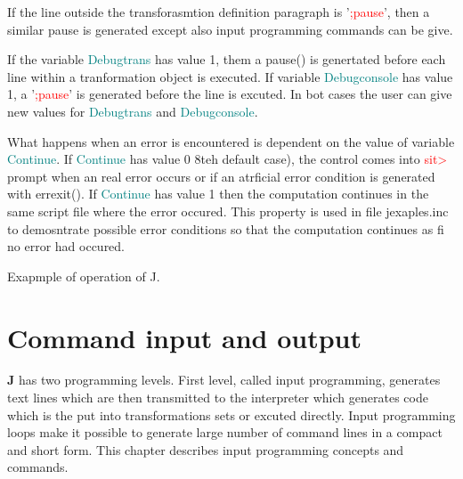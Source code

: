 If the line outside the transforasmtion definition paragraph is '\textcolor{Red}{;pause}', then
a similar pause is generated except also input programming commands can be give.

If the variable \textcolor{teal}{Debugtrans} has value 1, them a \textcolor{VioletRed}{pause}() is genertated before each line within
a tranformation object is executed.  If variable \textcolor{teal}{Debugconsole} has value 1,
a '\textcolor{Red}{;pause}' is generated before  the line is excuted. In bot cases the user can
give new values for \textcolor{teal}{Debugtrans} and \textcolor{teal}{Debugconsole}.

What happens when an error is encountered is dependent on the value of variable \textcolor{teal}{Continue}. If \textcolor{teal}{Continue} has
value 0 8teh default case), the control comes into \textcolor{Red}{sit>} prompt when an real error occurs or if an atrficial
error condition is generated with \textcolor{VioletRed}{errexit}(). If \textcolor{teal}{Continue} has value 1 then the computation continues in
the same script file where the error occured. This property is used in file jexaples.inc to demosntrate
possible error conditions so that the computation continues as fi no error had occured.

\begin{example}[operexr]Exapmple of operation of J.\\
\label{operexr}

\end{example}

\section{Command input and output}
\label{cominout}
\textbf{J} has two programming levels. First level, called input programming, generates text lines which are then
transmitted to the interpreter which generates code which is the put into transformations sets or
excuted directly. Input programming loops make it possible to generate large number of command lines
in a compact and short form. This chapter describes input programming concepts and commands.
